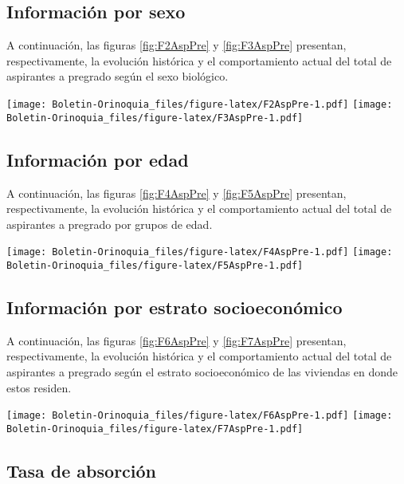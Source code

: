 \documentclass[
]{book}
\begin{document}
\hypertarget{informaciuxf3n-por-sexo}{%
\subsection{Información por sexo}\label{informaciuxf3n-por-sexo}}

A continuación, las figuras \ref{fig:F2AspPre} y \ref{fig:F3AspPre} presentan, respectivamente, la evolución histórica y el comportamiento actual del total de aspirantes a pregrado según el sexo biológico.

\texttt{[image: Boletin-Orinoquia\_files/figure-latex/F2AspPre-1.pdf]}
\texttt{[image: Boletin-Orinoquia\_files/figure-latex/F3AspPre-1.pdf]}

\hypertarget{informaciuxf3n-por-edad}{%
\subsection{Información por edad}\label{informaciuxf3n-por-edad}}

A continuación, las figuras \ref{fig:F4AspPre} y \ref{fig:F5AspPre} presentan, respectivamente, la evolución histórica y el comportamiento actual del total de aspirantes a pregrado por grupos de edad.

\texttt{[image: Boletin-Orinoquia\_files/figure-latex/F4AspPre-1.pdf]}
\texttt{[image: Boletin-Orinoquia\_files/figure-latex/F5AspPre-1.pdf]}

\hypertarget{informaciuxf3n-por-estrato-socioeconuxf3mico}{%
\subsection{Información por estrato socioeconómico}\label{informaciuxf3n-por-estrato-socioeconuxf3mico}}

A continuación, las figuras \ref{fig:F6AspPre} y \ref{fig:F7AspPre} presentan, respectivamente, la evolución histórica y el comportamiento actual del total de aspirantes a pregrado según el estrato socioeconómico de las viviendas en donde estos residen.

\texttt{[image: Boletin-Orinoquia\_files/figure-latex/F6AspPre-1.pdf]}
\texttt{[image: Boletin-Orinoquia\_files/figure-latex/F7AspPre-1.pdf]}

\hypertarget{tasa-de-absorciuxf3n}{%
\subsection{Tasa de absorción}\label{tasa-de-absorciuxf3n}}
\end{document}
